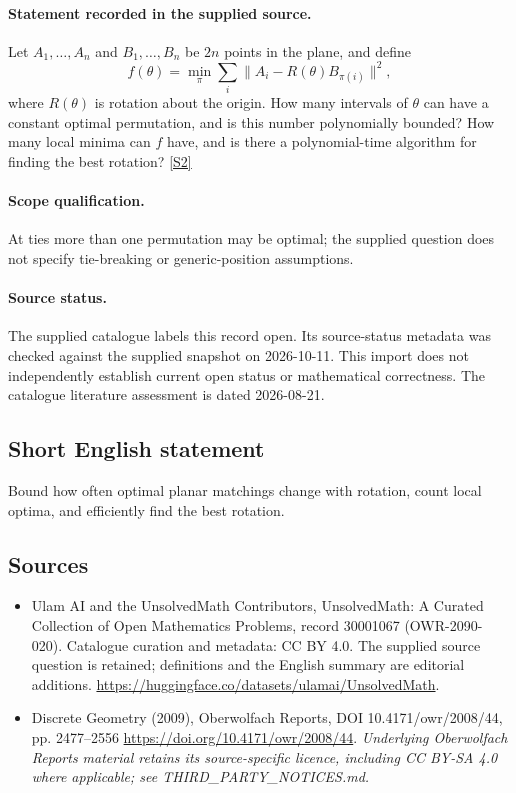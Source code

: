 \documentclass[11pt]{article}
\begin{document}
\paragraph{Statement recorded in the supplied source.}
Let $A_1,\ldots,A_n$ and $B_1,\ldots,B_n$ be $2n$ points in the plane, and define $$f(\theta)=\min_{\pi}\sum_i\|A_i-R(\theta)B_{\pi(i)}\|^2,$$ where $R(\theta)$ is rotation about the origin. How many intervals of $\theta$ can have a constant optimal permutation, and is this number polynomially bounded? How many local minima can $f$ have, and is there a polynomial-time algorithm for finding the best rotation? \href{https://doi.org/10.4171/owr/2008/44}{[S2]}
\paragraph{Scope qualification.}
At ties more than one permutation may be optimal; the supplied question does not specify tie-breaking or generic-position assumptions.
\paragraph{Source status.}
The supplied catalogue labels this record open. Its source-status metadata was checked against the supplied snapshot on 2026-10-11. This import does not independently establish current open status or mathematical correctness. The catalogue literature assessment is dated 2026-08-21.
\subsection{Short English statement}
Bound how often optimal planar matchings change with rotation, count local optima, and efficiently find the best rotation.
\subsection{Sources}
\begin{itemize}
\item[S1] Ulam AI and the UnsolvedMath Contributors, UnsolvedMath: A Curated Collection of Open Mathematics Problems, record 30001067 (OWR-2090-020). Catalogue curation and metadata: CC BY 4.0. The supplied source question is retained; definitions and the English summary are editorial additions.
\url{https://huggingface.co/datasets/ulamai/UnsolvedMath}.
\item[S2] Discrete Geometry (2009), Oberwolfach Reports, DOI 10.4171/owr/2008/44, pp. 2477--2556
\url{https://doi.org/10.4171/owr/2008/44}.
\textit{Underlying Oberwolfach Reports material retains its source-specific licence, including CC BY-SA 4.0 where applicable; see THIRD\_PARTY\_NOTICES.md.}
\end{itemize}
\end{document}
